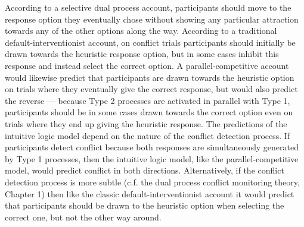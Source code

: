 According to a selective dual process account,
participants should move to the response option they eventually chose
without showing any particular attraction towards
any of the other options along the way.
According to a traditional default-interventionist account,
on conflict trials participants should initially be drawn
towards the heuristic response option,
but in some cases inhibit this response and instead select the correct option.
A parallel-competitive account would likewise predict that participants
are drawn towards the heuristic option on trials where they
eventually give the correct response,
but would also predict the reverse ---
because Type 2 processes are activated in parallel with Type 1,
participants should be in some cases drawn towards
the correct option even on trials where they
end up giving the heuristic response.
The predictions of the intuitive logic model
depend on the nature of the conflict detection process.
If participants detect conflict because
both responses are simultaneously generated by Type 1 processes,
then the intuitive logic model, like the parallel-competitive model,
would predict conflict in both directions.
Alternatively, if the conflict detection process is more subtle
(c.f. the dual process conflict monitoring theory, Chapter 1)
then like the classic default-interventionist account
it would predict that participants should be drawn to the heuristic option
when selecting the correct one, but not the other way around.

